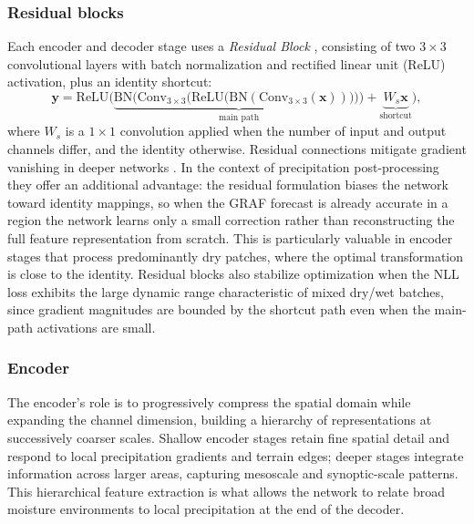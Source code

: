 \documentclass[11pt]{article}
\newcommand{\vect}[1]{\bm{#1}}
\begin{document}
\subsubsection{Residual blocks}
\label{sec:resblock}

Each encoder and decoder stage uses a \emph{Residual Block}
\citep{he2016}, consisting of two $3 \times 3$ convolutional
layers with batch normalization \citep[BN;][]{ioffe2015} and
rectified linear unit (ReLU) activation, plus an identity shortcut:
\begin{equation}
  \vect{y} = \text{ReLU}\!\Big(
    \underbrace{
      \text{BN}\big(\text{Conv}_{3\times3}\big(
        \text{ReLU}\big(\text{BN}(\text{Conv}_{3\times3}(\vect{x}))\big)
      \big)\big)
    }_{\text{main path}}
    + \underbrace{W_s \vect{x}}_{\text{shortcut}}
  \Big),
  \label{eq:resblock}
\end{equation}
where $W_s$ is a $1 \times 1$ convolution applied when the number
of input and output channels differ, and the identity otherwise.
Residual connections mitigate gradient vanishing in deeper networks
\citep{he2016}.  In the context of precipitation post-processing
they offer an additional advantage: the residual formulation biases
the network toward identity mappings, so when the GRAF forecast is
already accurate in a region the network learns only a small
correction rather than reconstructing the full feature
representation from scratch.  This is particularly valuable in
encoder stages that process predominantly dry patches, where the
optimal transformation is close to the identity.  Residual blocks
also stabilize optimization when the NLL loss exhibits the large
dynamic range characteristic of mixed dry/wet batches, since
gradient magnitudes are bounded by the shortcut path even when
the main-path activations are small.

\subsubsection{Encoder}
\label{sec:encoder}

The encoder's role is to progressively compress the spatial domain
while expanding the channel dimension, building a hierarchy of
representations at successively coarser scales.  Shallow encoder
stages retain fine spatial detail and respond to local precipitation
gradients and terrain edges; deeper stages integrate information
across larger areas, capturing mesoscale and synoptic-scale patterns.
This hierarchical feature extraction is what allows the network to
relate broad moisture environments to local precipitation at the
end of the decoder.
\end{document}
